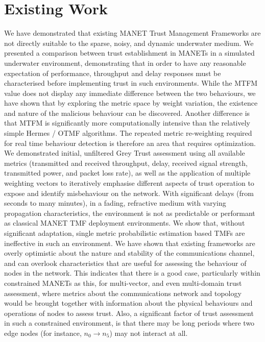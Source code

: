 \section{Existing Work}

We have demonstrated that existing MANET Trust Management Frameworks are not directly suitable to the sparse, noisy, and dynamic underwater medium.
We presented a comparison between trust establishment in MANETs in a simulated underwater environment, demonstrating that in order to have any reasonable expectation of performance, throughput and delay responses must be characterised before implementing trust in such environments.  While the MTFM value does not display any immediate difference between the two behaviours, we have shown that by exploring the metric space by weight variation, the existence and nature of the malicious behaviour can be discovered. Another difference is that MTFM is significantly more computationally intensive than the relatively simple Hermes / OTMF algorithms. The repeated metric re-weighting required for real time behaviour detection is therefore an area that requires optimization. 
We demonstrated initial, unfiltered Grey Trust assessment using all available metrics (transmitted and received throughput, delay, received signal strength, transmitted power, and packet loss rate), as well as the application of multiple weighting vectors to iteratively emphasise different aspects of trust operation to expose and identify misbehaviour on the network. With significant delays (from seconds to many minutes), in a fading, refractive medium with varying propagation characteristics, the environment is not as predictable or performant as classical MANET TMF deployment environments. We show that, without significant adaptation, single metric probabilistic estimation based TMFs are ineffective in such an environment.
We have shown that existing frameworks are overly optimistic about the nature and stability of the communications channel, and can overlook characteristics that are useful for assessing the behaviour of nodes in the network. 
This indicates that there is a good case, particularly within constrained MANETs as this, for multi-vector, and even multi-domain trust assessment, where metrics about the communications network and topology would be brought together with information about the physical behaviours and operations of nodes to assess trust. Also, a significant factor of trust assessment in such a constrained environment, is that there may be long periods where two edge nodes (for instance, $n_0 \to n_5$) may not interact at all. 
